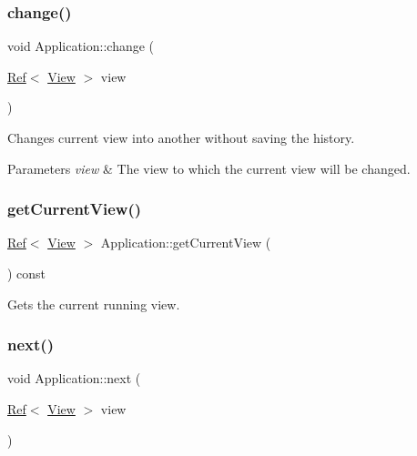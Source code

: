 \mbox{\label{class_application_adc075972df579dbdbe46013da51ed70c}} 
\subsubsection{\texorpdfstring{change()}{change()}}
{\footnotesize\ttfamily void Application\+::change (\begin{DoxyParamCaption}\item[{\mbox{\hyperlink{class_ref}{Ref}}$<$ \mbox{\hyperlink{class_view}{View}} $>$}]{view }\end{DoxyParamCaption})}



Changes current view into another without saving the history. 


\begin{DoxyParams}{Parameters}
{\em view} & The view to which the current view will be changed. \\
\hline
\end{DoxyParams}
\mbox{\label{class_application_a9099ecb8b2568c89dde070a8b701715a}} 
\subsubsection{\texorpdfstring{getCurrentView()}{getCurrentView()}}
{\footnotesize\ttfamily \mbox{\hyperlink{class_ref}{Ref}}$<$ \mbox{\hyperlink{class_view}{View}} $>$ Application\+::get\+Current\+View (\begin{DoxyParamCaption}{ }\end{DoxyParamCaption}) const}



Gets the current running view. 

\mbox{\label{class_application_a95a10ebbce931b4c58116c492ab163be}} 
\subsubsection{\texorpdfstring{next()}{next()}}
{\footnotesize\ttfamily void Application\+::next (\begin{DoxyParamCaption}\item[{\mbox{\hyperlink{class_ref}{Ref}}$<$ \mbox{\hyperlink{class_view}{View}} $>$}]{view }\end{DoxyParamCaption})}



